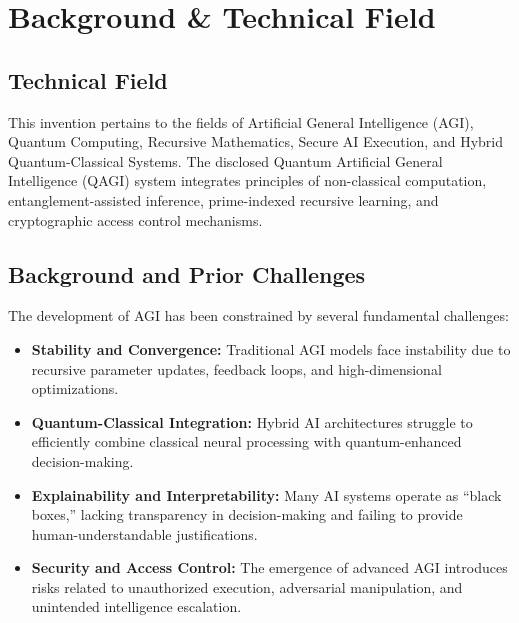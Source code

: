 \documentclass{article}
\theoremstyle{plain}
\theoremstyle{claimstyle}
\begin{document}
\section{Background \& Technical Field}

\subsection{Technical Field}
This invention pertains to the fields of Artificial General Intelligence (AGI), Quantum Computing, 
Recursive Mathematics, Secure AI Execution, and Hybrid Quantum-Classical Systems. 
The disclosed Quantum Artificial General Intelligence (QAGI) system integrates principles of 
non-classical computation, entanglement-assisted inference, prime-indexed recursive learning, 
and cryptographic access control mechanisms.

\subsection{Background and Prior Challenges}
The development of AGI has been constrained by several fundamental challenges:
\begin{itemize}
\item \textbf{Stability and Convergence:} Traditional AGI models face instability due to recursive parameter updates,
      feedback loops, and high-dimensional optimizations.
\item \textbf{Quantum-Classical Integration:} Hybrid AI architectures struggle to efficiently combine classical neural
      processing with quantum-enhanced decision-making.
\item \textbf{Explainability and Interpretability:} Many AI systems operate as ``black boxes,'' lacking transparency in
      decision-making and failing to provide human-understandable justifications.
\item \textbf{Security and Access Control:} The emergence of advanced AGI introduces risks related to unauthorized
      execution, adversarial manipulation, and unintended intelligence escalation.
\end{itemize}
\end{document}
